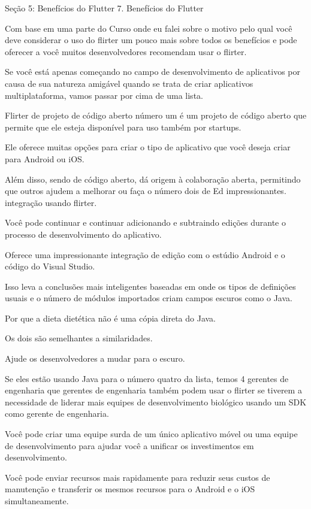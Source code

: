 Seção 5: Benefícios do Flutter
7. Benefícios do Flutter

Com base em uma parte do Curso onde eu falei sobre o motivo pelo qual você deve considerar o uso do flirter um pouco mais sobre todos os benefícios e pode oferecer a você muitos desenvolvedores recomendam usar o flirter.

Se você está apenas começando no campo de desenvolvimento de aplicativos por causa de sua natureza amigável quando se trata de criar aplicativos multiplataforma, vamos passar por cima de uma lista.

Flirter de projeto de código aberto número um é um projeto de código aberto que permite que ele esteja disponível para uso também por startups.

Ele oferece muitas opções para criar o tipo de aplicativo que você deseja criar para Android ou iOS.

Além disso, sendo de código aberto, dá origem à colaboração aberta, permitindo que outros ajudem a melhorar ou faça o número dois de Ed impressionantes. integração usando flirter.

Você pode continuar e continuar adicionando e subtraindo edições durante o processo de desenvolvimento do aplicativo.

Oferece uma impressionante integração de edição com o estúdio Android e o código do Visual Studio.

Isso leva a conclusões mais inteligentes baseadas em onde os tipos de definições usuais e o número de módulos importados criam campos escuros como o Java.

Por que a dieta dietética não é uma cópia direta do Java.

Os dois são semelhantes a similaridades.

Ajude os desenvolvedores a mudar para o escuro.

Se eles estão usando Java para o número quatro da lista, temos 4 gerentes de engenharia que gerentes de engenharia também podem usar o flirter se tiverem a necessidade de liderar mais equipes de desenvolvimento biológico usando um SDK como gerente de engenharia.

Você pode criar uma equipe surda de um único aplicativo móvel ou uma equipe de desenvolvimento para ajudar você a unificar os investimentos em desenvolvimento.

Você pode enviar recursos mais rapidamente para reduzir seus custos de manutenção e transferir os mesmos recursos para o Android e o iOS simultaneamente.

